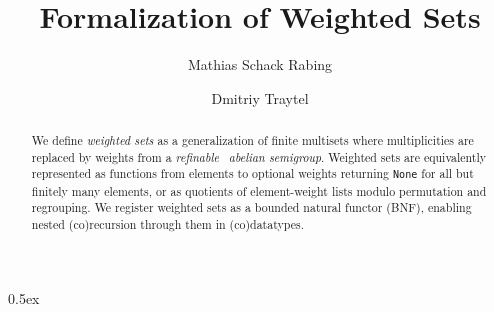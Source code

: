 \documentclass[11pt,a4paper]{article}
\title{Formalization of Weighted Sets}
\author{Mathias Schack Rabing \and Dmitriy Traytel}
\begin{document}
\maketitle

\begin{abstract}
  We define \emph{weighted sets} as a generalization of finite multisets where
  multiplicities are replaced by weights from a \emph{refinable}~\cite{DBLP:journals/entcs/GummS01} \emph{abelian semi\-group}.
  Weighted sets are equivalently represented as functions from elements to optional
  weights returning \texttt{None} for all but finitely many elements, or as quotients
  of element-weight lists modulo permutation and regrouping.
  We register weighted sets as a bounded natural functor (BNF), enabling nested (co)recursion through them
  in (co)datatypes.
\end{abstract}

\tableofcontents

\newpage
\parindent 0pt\parskip 0.5ex





\end{document}

